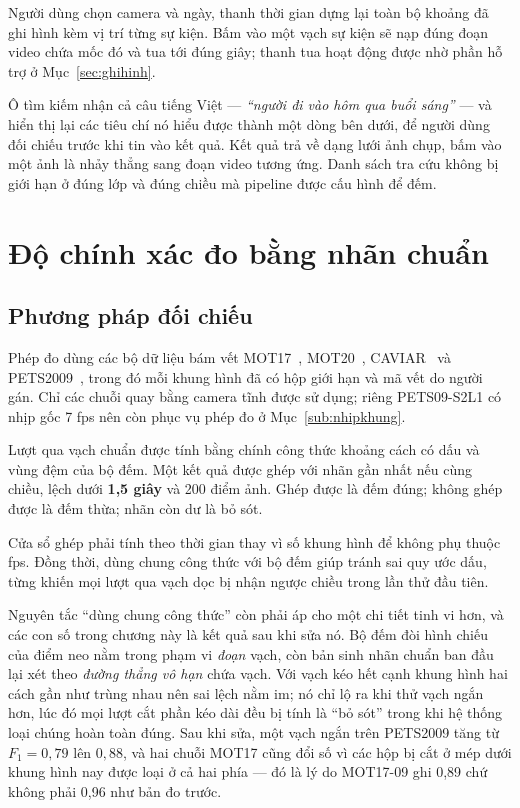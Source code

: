 Người dùng chọn camera và ngày, thanh thời gian dựng lại toàn bộ khoảng đã ghi hình
kèm vị trí từng sự kiện. Bấm vào một vạch sự kiện sẽ nạp đúng đoạn video chứa mốc đó
và tua tới đúng giây; thanh tua hoạt động được nhờ phần hỗ trợ  ở
Mục~\ref{sec:ghihinh}.

Ô tìm kiếm nhận cả câu tiếng Việt --- \emph{``người đi vào hôm qua buổi sáng''} --- và
hiển thị lại các tiêu chí nó hiểu được thành một dòng bên dưới, để người dùng đối chiếu
trước khi tin vào kết quả. Kết quả trả về dạng lưới ảnh chụp, bấm vào một ảnh là nhảy
thẳng sang đoạn video tương ứng. Danh sách tra cứu không bị giới hạn ở đúng lớp và
đúng chiều mà pipeline được cấu hình để đếm.

\section{Độ chính xác đo bằng nhãn chuẩn}
\label{sec:mot17}

\subsection{Phương pháp đối chiếu}

Phép đo dùng các bộ dữ liệu bám vết MOT17~\cite{milan2016mot16}, MOT20~\cite{dendorfer2020mot20},
CAVIAR~\cite{caviar2004} và PETS2009~\cite{ferryman2009pets}, trong đó mỗi
khung hình đã có hộp giới hạn và mã vết do người gán. Chỉ các chuỗi quay bằng camera
tĩnh được sử dụng; riêng PETS09-S2L1 có nhịp gốc 7 fps nên còn phục vụ phép đo ở
Mục~\ref{sub:nhipkhung}.

Lượt qua vạch chuẩn được tính bằng chính công thức khoảng cách có dấu và vùng đệm của
bộ đếm. Một kết quả được ghép với nhãn gần nhất nếu cùng chiều, lệch dưới
\textbf{1{,}5 giây} và 200 điểm ảnh. Ghép được là đếm đúng; không ghép được là đếm
thừa; nhãn còn dư là bỏ sót.

Cửa sổ ghép phải tính theo thời gian thay vì số khung hình để không phụ thuộc fps.
Đồng thời, dùng chung công thức với bộ đếm giúp tránh sai quy ước dấu, từng khiến mọi
lượt qua vạch dọc bị nhận ngược chiều trong lần thử đầu tiên.

Nguyên tắc ``dùng chung công thức'' còn phải áp cho một chi tiết tinh vi hơn, và các con
số trong chương này là kết quả sau khi sửa nó. Bộ đếm đòi hình chiếu của điểm neo nằm
trong phạm vi \emph{đoạn} vạch, còn bản sinh nhãn chuẩn ban đầu lại xét theo
\emph{đường thẳng vô hạn} chứa vạch. Với vạch kéo hết cạnh khung hình hai cách gần như
trùng nhau nên sai lệch nằm im; nó chỉ lộ ra khi thử vạch ngắn hơn, lúc đó mọi lượt cắt
phần kéo dài đều bị tính là ``bỏ sót'' trong khi hệ thống loại chúng hoàn toàn đúng.
Sau khi sửa, một vạch ngắn trên PETS2009 tăng từ $F_1 = 0{,}79$ lên $0{,}88$, và hai
chuỗi MOT17 cũng đổi số vì các hộp bị cắt ở mép dưới khung hình nay được loại ở cả hai
phía --- đó là lý do MOT17-09 ghi 0{,}89 chứ không phải 0{,}96 như bản đo trước.

